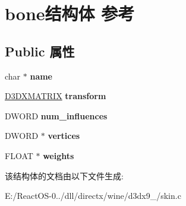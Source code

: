 \hypertarget{structbone}{}\section{bone结构体 参考}
\label{structbone}
\subsection*{Public 属性}
\begin{DoxyCompactItemize}
\item 
\mbox{\label{structbone_a1559e42dc85735a6f51f53eb8279d0e4}} 
char $\ast$ {\bfseries name}
\item 
\mbox{\label{structbone_a3c0d4fb6caf943b3a85484bbbf648614}} 
\hyperlink{struct___d3_d_m_a_t_r_i_x}{D3\+D\+X\+M\+A\+T\+R\+IX} {\bfseries transform}
\item 
\mbox{\label{structbone_a5691d01386ec9a3b6396fd7efdb4fbf6}} 
D\+W\+O\+RD {\bfseries num\+\_\+influences}
\item 
\mbox{\label{structbone_a2e35b52a5688f3c7266269ba2b4b286b}} 
D\+W\+O\+RD $\ast$ {\bfseries vertices}
\item 
\mbox{\label{structbone_a0ede15ee8acbcc22020de57eaaec2b9d}} 
F\+L\+O\+AT $\ast$ {\bfseries weights}
\end{DoxyCompactItemize}


该结构体的文档由以下文件生成\+:\begin{DoxyCompactItemize}
\item 
E\+:/\+React\+O\+S-\/0../dll/directx/wine/d3dx9\+\_/skin.\+c\end{DoxyCompactItemize}
